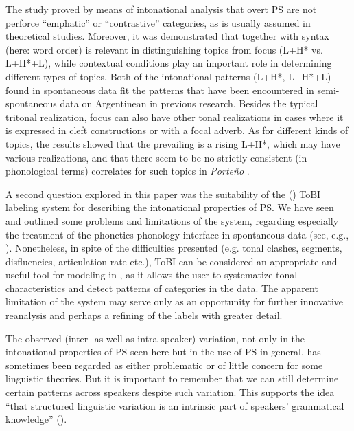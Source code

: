 \documentclass[output=paper]{langsci/langscibook}
\begin{document}
The study proved by means of intonational analysis that overt PS are not perforce ``emphatic'' or ``contrastive'' categories, as is usually assumed in theoretical studies. Moreover, it was demonstrated that  together with syntax (here: word order) is relevant in distinguishing topics from focus (L+H* vs. L+H*+L), while contextual conditions play an important role in determining different types of topics. Both of the intonational patterns (L+H*, L+H*+L) found in spontaneous data fit the patterns that have been encountered in semi-spontaneous data on Argentinean  in previous research. Besides the typical tritonal realization, focus can also have other tonal realizations in cases where it is expressed in cleft constructions or with a focal adverb. As for different kinds of topics, the results showed that the prevailing  is a rising L+H*, which may have various  realizations, and that there seem to be no strictly consistent (in phonological terms) correlates for such topics in \textit{Porte{\~n}o} .

A second question explored in this paper was the suitability of the () ToBI labeling system for describing the intonational properties of PS. We have seen and outlined some problems and limitations of the system, regarding especially the treatment of the phonetics-phonology interface in spontaneous data (see, e.g., \citealt{Breen2012}). Nonetheless, in spite of the difficulties presented (e.g. tonal clashes,  segments, disfluencies, articulation rate etc.), ToBI can be considered an appropriate and useful tool for  modeling in , as it allows the user to systematize tonal characteristics and detect patterns of categories in the data. The apparent limitation of the system may serve only as an opportunity for further innovative reanalysis and perhaps a refining of the labels with greater  detail.\pagebreak

The observed (inter- as well as intra-speaker) variation, not only in the intonational properties of PS seen here but in the use of PS in general, has sometimes been regarded as either problematic or of little concern for some linguistic theories. But it is important to remember that we can still determine certain patterns across speakers despite such variation. This supports the idea ``that structured linguistic variation is an intrinsic part of speakers’ grammatical knowledge'' (\citealt[xiii]{Carvalho2015}).
\end{document}
